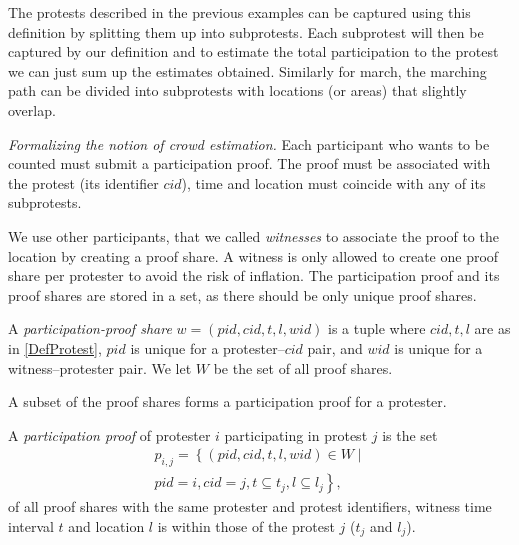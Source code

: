 The protests described in the previous examples can be captured using this definition by splitting 
them up into subprotests.
Each subprotest will then be captured by our definition and to estimate the total participation to the protest we can just sum up the estimates obtained.
Similarly for march, the marching path can be divided into subprotests with locations (or areas) that slightly overlap.

\emph{Formalizing the notion of crowd estimation.} Each participant who wants to be counted must submit a participation proof.
The proof must be associated with the protest (\ie its identifier \(cid\)), time and location must coincide with any of its subprotests.

We use other participants, that we called \emph{witnesses} to associate the proof to the location by creating a proof 
share.
A witness is only allowed to create one proof share per protester to avoid the risk of inflation.
The participation proof and its proof shares are stored in a set, as there should be only unique proof shares.

\begin{definition}
  A \emph{participation-proof share} \(w = (pid, cid, t, l, wid)\) is a tuple 
  where
  \(cid, t, l\) are as in \cref{DefProtest},
  \(pid\) is unique for a protester--\(cid\) pair, and
  \(wid\) is unique for a witness--protester pair.
  We let \(W\) be the set of all proof shares.
\end{definition}

A subset of the proof shares forms a participation proof for a protester.

\begin{definition}
  A \emph{participation proof} of protester \(i\) participating in protest \(j\) 
  is the set
  \begin{multline}
    \nonumber
    p_{i, j} =
    \left\{ (pid, cid, t, l, wid)\in W \mid \right. \\
    \left. pid = i, cid = j,
    t \subseteq t_j, l\subseteq l_j \right\},
  \end{multline}
  of all proof shares with the same protester and protest identifiers, witness 
  time interval \(t\) and location \(l\) is within those of the protest \(j\) 
  (\ie \(t_j\) and \(l_j\)).
\end{definition}

